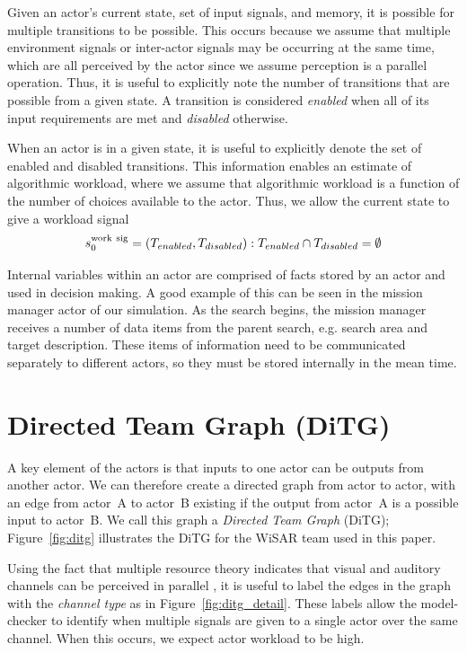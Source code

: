 \documentclass[letterpaper]{article}
\begin{document}
Given an actor's current state, set of input signals, and memory, it is possible for multiple transitions to be possible.  This occurs because we assume that multiple environment signals or inter-actor signals may be occurring at the same time, which are all perceived by the actor since we assume perception is a parallel operation.  Thus, it is useful to explicitly note the number of transitions that are possible from a given state.   A transition is considered {\em enabled} when all of its input
requirements are met and {\em disabled} otherwise. 

When an actor is in a given state, it is useful to explicitly denote the set of enabled and disabled transitions.  This information enables an estimate of algorithmic workload, where we assume that algorithmic workload is a function of the number of choices available to the actor.  Thus, we allow the current state to give a workload signal
\begin{equation}
	s_0^{\rm work\  sig} = (T_{enabled}, T_{disabled}) : T_{enabled} \cap T_{disabled} = \emptyset
 \label{eq:state}
\end{equation}

Internal variables within an actor are comprised of facts stored by an actor and used in decision making.
A good example of this can be seen in the mission manager actor of our simulation. As the search begins, the mission manager receives a number of data items from the parent search, e.g. search area and target description. These items of information need to be communicated separately to different actors, so they must be stored internally in the mean time. 

\section{Directed Team Graph (DiTG)}

A key element of the actors is that inputs to one actor can be outputs from another actor.  We can therefore create a directed graph from actor to actor, with an edge from actor~A to actor~B existing if the output from actor~A is a possible input to actor~B.  We call this graph a {\em Directed Team Graph} (DiTG); Figure~\ref{fig:ditg} illustrates the DiTG for the WiSAR team used in this paper.   

Using the fact that multiple resource theory indicates that visual and auditory channels can be perceived in parallel \cite{wickens2002multiple}, it is useful to label the edges in the graph with the {\em channel type} as in Figure~\ref{fig:ditg_detail}.  These labels allow the model-checker to identify when multiple signals are given to a single actor over the same channel.  When this occurs, we expect actor workload to be high.
\end{document}
